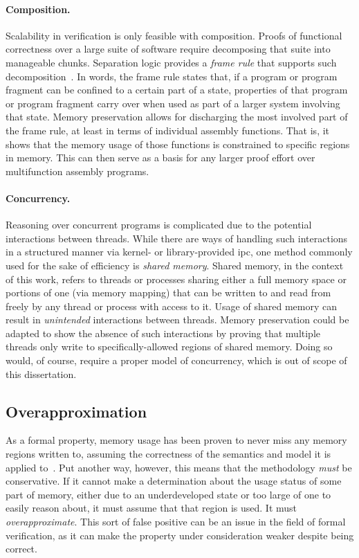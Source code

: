\paragraph{Composition.}\label{sse:composition}
Scalability in verification is only feasible with composition.
Proofs of functional correctness over a large suite of software
require decomposing that suite into manageable chunks.
Separation logic provides a \emph{frame rule} that supports such%
%
decomposition~\citep{o2001local,reynolds2002separation,krebbers2017essence}.
In words, the frame rule states that,
if a program or program fragment can be confined to a certain part of a state,
properties of that program or program fragment carry over
when used as part of a larger system involving that state.
Memory preservation allows for discharging the most involved part of the frame rule,
at least in terms of individual assembly functions.
That is, it shows that the memory usage of those functions is constrained
to specific regions in memory.
This can then serve as a basis
for any larger proof effort over multifunction assembly programs.

\paragraph{Concurrency.}
Reasoning over concurrent programs is complicated
due to the potential interactions between threads.
While there are ways of handling such interactions in a structured manner
via kernel- or library-provided \ac{ipc},
one method commonly used for the sake of efficiency is \emph{shared memory}.
Shared memory, in the context of this work,
refers to threads or processes sharing either a full memory space
or portions of one (via memory mapping)
that can be written to and read from freely by any thread or process with access to it.
Usage of shared memory can result in \emph{unintended} interactions between threads.
Memory preservation could be adapted to show the absence of such interactions
by proving that multiple threads only write
to specifically-allowed regions of shared memory.
Doing so would, of course, require a proper model of concurrency,
which is out of scope of this dissertation.

\subsection{Overapproximation}\label{mem_use_over}
As a formal property, memory usage has been proven to never miss any memory regions
written to, assuming the correctness of the semantics and model it is applied
to~\citep{bockenek2019preservation,popl2019underreview}.
Put another way, however,
this means that the methodology \emph{must} be conservative.
If it cannot make a determination about the usage status of some part of memory,
either due to an underdeveloped state or too large of one to easily reason about,
it must assume that that region is used. It must \emph{overapproximate}.%
This sort of false positive can be an issue in the field of formal verification,
as it can make the property under consideration weaker despite being correct.

